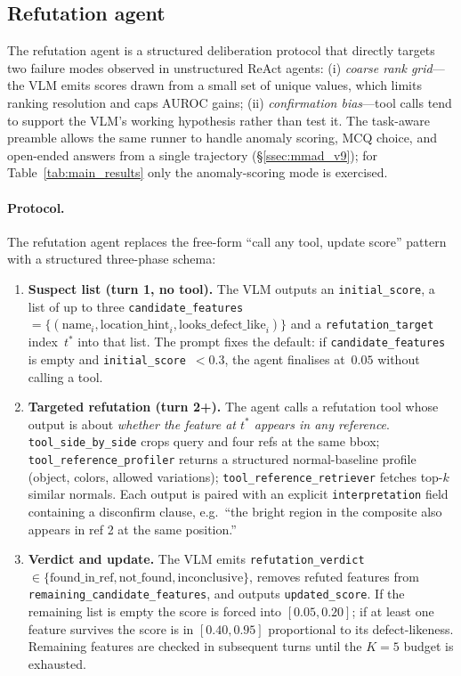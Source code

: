 \subsection{Refutation agent}
\label{ssec:refutation}

The refutation agent is a structured deliberation protocol that
directly targets two failure modes observed in unstructured ReAct
agents: (i) \emph{coarse rank grid}---the VLM emits scores drawn from a
small set of unique values, which limits ranking resolution and caps
AUROC gains; (ii) \emph{confirmation bias}---tool calls tend to support
the VLM's working hypothesis rather than test it. The task-aware
preamble allows the same runner to handle anomaly scoring, MCQ choice,
and open-ended answers from a single trajectory (\S\ref{ssec:mmad_v9});
for Table~\ref{tab:main_results} only the anomaly-scoring mode is
exercised.

\paragraph{Protocol.}
The refutation agent replaces the free-form ``call any tool, update
score'' pattern with a structured three-phase schema:
\begin{enumerate}
    \item \textbf{Suspect list (turn 1, no tool).} The VLM outputs an \texttt{initial\_score}, a list of up to three \texttt{candidate\_features}~$=\{(\text{name}_i, \text{location\_hint}_i, \text{looks\_defect\_like}_i)\}$ and a \texttt{refutation\_target} index~$t^*$ into that list. The prompt fixes the default: if \texttt{candidate\_features} is empty and \texttt{initial\_score}~$<0.3$, the agent finalises at~$0.05$ without calling a tool.
    \item \textbf{Targeted refutation (turn 2+).} The agent calls a refutation tool whose output is about \emph{whether the feature at $t^*$ appears in any reference}. \texttt{tool\_side\_by\_side} crops query and four refs at the same bbox; \texttt{tool\_reference\_profiler} returns a structured normal-baseline profile (object, colors, allowed variations); \texttt{tool\_reference\_retriever} fetches top-$k$ similar normals. Each output is paired with an explicit \texttt{interpretation} field containing a disconfirm clause, e.g.\ ``the bright region in the composite also appears in ref 2 at the same position.''
    \item \textbf{Verdict and update.} The VLM emits \texttt{refutation\_verdict} $\in \{\text{found\_in\_ref}, \text{not\_found}, \text{inconclusive}\}$, removes refuted features from \texttt{remaining\_candidate\_features}, and outputs \texttt{updated\_score}. If the remaining list is empty the score is forced into $[0.05, 0.20]$; if at least one feature survives the score is in $[0.40, 0.95]$ proportional to its defect-likeness. Remaining features are checked in subsequent turns until the $K{=}5$ budget is exhausted.
\end{enumerate}

